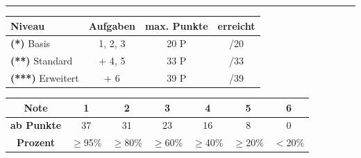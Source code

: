 \documentclass[11pt,a4paper]{article}
\newcommand{\stern}[1]{\textbf{(#1)}}
\begin{document}
\vspace{1.5em}

\hrule
\vspace{0.5em}

\begin{center}
\renewcommand{\arraystretch}{1.3}
\begin{tabular}{|l|c|c|c|}
\hline
\textbf{Niveau} & \textbf{Aufgaben} & \textbf{max. Punkte} & \textbf{erreicht} \\
\hline
\stern{*} Basis & 1, 2, 3 & 20 P & \hspace{1.2cm}/20 \\
\hline
\stern{**} Standard & + 4, 5 & 33 P & \hspace{1.2cm}/33 \\
\hline
\stern{***} Erweitert & + 6 & 39 P & \hspace{1.2cm}/39 \\
\hline
\end{tabular}
\end{center}

\vspace{0.3em}

\begin{center}
\small
\begin{tabular}{|c|c|c|c|c|c|c|}
\hline
\textbf{Note} & 1 & 2 & 3 & 4 & 5 & 6 \\
\hline
\textbf{ab Punkte} & 37 & 31 & 23 & 16 & 8 & 0 \\
\hline
\textbf{Prozent} & $\geq$95\% & $\geq$80\% & $\geq$60\% & $\geq$40\% & $\geq$20\% & $<$20\% \\
\hline
\end{tabular}
\end{center}
\end{document}

